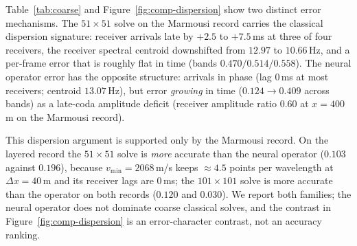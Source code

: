 \documentclass[11pt,a4paper]{article}
\begin{document}
\begin{table}[t]
\centering
\caption{Coarse-grid classical solves against the neural operator, future-window relative
$L^2$ (bands B1/B2/B3 in parentheses), train-development records. The coarse columns include
medium-sampling error (see text). At $\Delta x=40$\,m the Marmousi record has $\approx3.3$
points per minimum wavelength ($v_{\min}=1500$\,m/s), below the eighth-order comfort zone;
the layered record retains $\approx4.5$ ($v_{\min}=2068$\,m/s).}
\label{tab:coarse}
\end{table}

Table~\ref{tab:coarse} and Figure~\ref{fig:comp-dispersion} show two distinct error
mechanisms. The $51\times51$ solve on the Marmousi record carries the classical dispersion
signature: receiver arrivals late by $+2.5$ to $+7.5$\,ms at three of four receivers, the
receiver spectral centroid downshifted from $12.97$ to $10.66$\,Hz, and a per-frame error
that is roughly flat in time (bands $0.470/0.514/0.558$). The neural operator error has the
opposite structure: arrivals in phase (lag $0$\,ms at most receivers; centroid $13.07$\,Hz),
but error \emph{growing} in time ($0.124 \to 0.409$ across bands) as a late-coda amplitude
deficit (receiver amplitude ratio $0.60$ at $x=400$\,m on the Marmousi record).

This dispersion argument is supported only by the Marmousi record. On the layered record
the $51\times51$ solve is \emph{more} accurate than the neural operator ($0.103$ against
$0.196$), because $v_{\min}=2068$\,m/s keeps $\approx4.5$ points per wavelength at
$\Delta x=40$\,m and its receiver lags are $0$\,ms; the $101\times101$ solve is more
accurate than the operator on both records ($0.120$ and $0.030$). We report both families;
the neural operator does not dominate coarse classical solves, and the contrast in
Figure~\ref{fig:comp-dispersion} is an error-character contrast, not an accuracy ranking.
\end{document}
